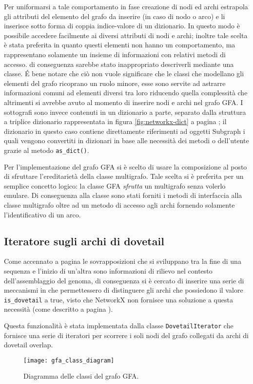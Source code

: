 Per uniformarsi a tale comportamento \pygfa in fase creazione di nodi ed
archi estrapola gli attributi del elemento del grafo da inserire (in caso di nodo o arco)
e li inserisce sotto forma di coppia indice-valore di un dizionario. In questo modo
è possibile accedere facilmente ai diversi attributi di nodi e archi; inoltre
tale scelta è stata preferita in quanto questi elementi non hanno un comportamento,
ma rappresentano solamente un insieme di informazioni con relativi metodi di accesso.
di conseguenza sarebbe stato inappropriato descriverli mediante una classe.
\'E bene notare che ciò non vuole significare che le classi che modellano gli elementi
del grafo ricoprano un ruolo minore, esse sono servite ad astrarre informazioni
comuni ad elementi diversi tra loro riducendo quella complessità che altrimenti si
avrebbe avuto al momento di inserire nodi e archi nel grafo GFA.
I sottografi sono invece contenuti in un dizionario a parte, separato dalla struttura a
triplice dizionario rappresentata in figura \ref{fig:networkx-dict} a pagina \pageref{fig:networkx-dict};
il dizionario in questo caso contiene direttamente riferimenti ad oggetti Subgraph i quali
vengono convertiti in dizionari in base alle necessità dei metodi o dell'utente grazie
al metodo \texttt{as\_dict()}.

Per l'implementazione del grafo GFA si è scelto di usare la composizione al posto
di sfruttare l'ereditarietà della classe multigrafo. Tale scelta si è preferita per
un semplice concetto logico: la classe GFA \emph{sfrutta} un multigrafo senza
volerlo emulare. Di conseguenza alla classe sono stati forniti i metodi di interfaccia
alla classe multigrafo oltre ad un metodo di accesso agli archi fornendo
solamente l'identificativo di un arco.

\subsection{Iteratore sugli archi di dovetail}
Come accennato a pagina \pageref{sec:link} le sovrapposizioni
che si sviluppano tra la fine di una sequenza e l'inizio di un'altra sono
informazioni di rilievo nel contesto dell'assemblaggio del genoma,
di conseguenza si è cercato di inserire una serie di meccanismi in \pygfa
che permettessero di distinguere gli archi che possiedono
il valore \texttt{is\_dovetail} a true, visto che NetworkX non fornisce
una soluzione a questa necessità (come descritto a pagina \pageref{sec:nx-why-limits}).

Questa funzionalità è stata implementata dalla classe \texttt{DovetailIterator} che
fornisce una serie di iteratori per scorrere i soli nodi del grafo collegati da archi di
dovetail overlap.
\noindent
\begin{figure}[t]
	\centering
	\texttt{[image: gfa\_class\_diagram]}
	\caption[Diagramma delle classi del grafo GFA]{Diagramma delle classi del grafo GFA.}
\end{figure}
\clearpage


